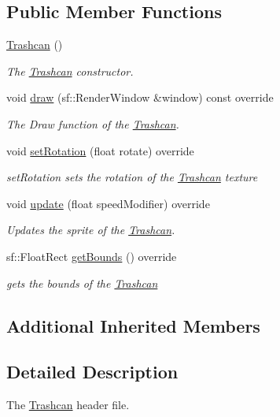 \subsection*{Public Member Functions}
\begin{DoxyCompactItemize}
\item 
\hyperlink{class_trashcan_a2ed97239469f8fe39dd81fb00a270319}{Trashcan} ()
\begin{DoxyCompactList}\small\item\em The \hyperlink{class_trashcan}{Trashcan} constructor. \end{DoxyCompactList}\item 
void \hyperlink{class_trashcan_a25dfd8dbd49f4b43144f873451743050}{draw} (sf\+::\+Render\+Window \&window) const override
\begin{DoxyCompactList}\small\item\em The Draw function of the \hyperlink{class_trashcan}{Trashcan}. \end{DoxyCompactList}\item 
void \hyperlink{class_trashcan_abd57bce536a5bdabc9121836d8f78e6d}{set\+Rotation} (float rotate) override
\begin{DoxyCompactList}\small\item\em set\+Rotation sets the rotation of the \hyperlink{class_trashcan}{Trashcan} texture \end{DoxyCompactList}\item 
void \hyperlink{class_trashcan_a6d44d844ec5c4155158b4e4d5fc222a4}{update} (float speed\+Modifier) override
\begin{DoxyCompactList}\small\item\em Updates the sprite of the \hyperlink{class_trashcan}{Trashcan}. \end{DoxyCompactList}\item 
sf\+::\+Float\+Rect \hyperlink{class_trashcan_a2f3f2159749141665d9c71547474b9f2}{get\+Bounds} () override
\begin{DoxyCompactList}\small\item\em gets the bounds of the \hyperlink{class_trashcan}{Trashcan} \end{DoxyCompactList}\end{DoxyCompactItemize}
\subsection*{Additional Inherited Members}


\subsection{Detailed Description}
The \hyperlink{class_trashcan}{Trashcan} header file. 

